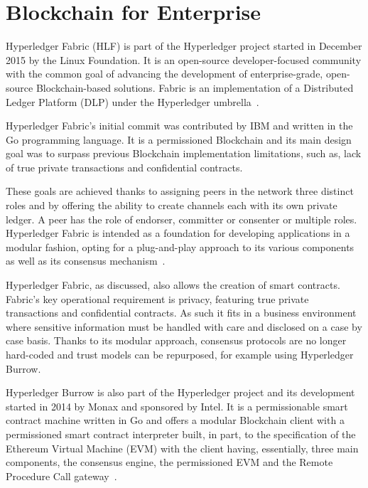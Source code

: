 \section{Blockchain for Enterprise} \label{enterpriseBlockchain}

Hyperledger Fabric (HLF) is part of the Hyperledger project started in December
2015 by the Linux Foundation. It is an open-source developer-focused community
with the common goal of advancing the development of enterprise-grade,
open-source Blockchain-based solutions.  Fabric is an implementation of a
Distributed Ledger Platform (DLP) under the Hyperledger
umbrella~\cite{Cachin2016}.

Hyperledger Fabric’s initial commit was contributed by IBM and written in the
Go programming language.  It is a permissioned Blockchain and its main design
goal was to surpass previous Blockchain implementation limitations, such as,
lack of true private transactions and confidential contracts.

These goals are achieved thanks to assigning peers in the network three
distinct roles and by offering the ability to create channels each with its own
private ledger.  A peer has the role of endorser, committer or consenter
or multiple roles.  Hyperledger Fabric is intended as a foundation for
developing applications in a modular fashion, opting for a plug-and-play
approach to its various components as well as its consensus
mechanism~\cite{HyperledgerFabricDocs2017}.

Hyperledger Fabric, as discussed, also allows the creation of smart contracts.
Fabric's key operational requirement is privacy, featuring true private
transactions and confidential contracts. As such it fits in a business
environment where sensitive information must be handled with care and disclosed
on a case by case basis. Thanks to its modular approach, consensus protocols
are no longer hard-coded and trust models can be repurposed, for example using
Hyperledger Burrow.

Hyperledger Burrow is also part of the Hyperledger project and its development
started in 2014 by Monax and sponsored by Intel. It is a permissionable smart
contract machine written in Go and offers a modular Blockchain client with a
permissioned smart contract interpreter built, in part, to the specification of
the Ethereum Virtual Machine (EVM) with the client having, essentially, three
main components, the consensus engine, the permissioned EVM and the Remote
Procedure Call gateway~\cite{Kuhlman2017,HyperledgerBurrow2017}.

